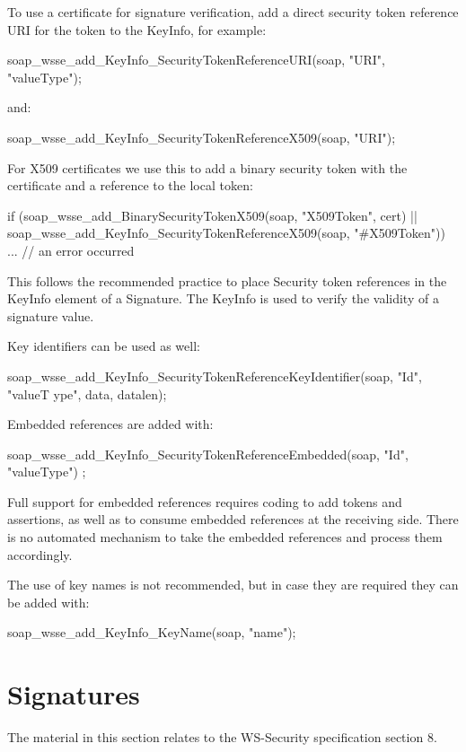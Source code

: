 To use a certificate for signature verification, add a direct security token reference URI for the token to the KeyInfo, for example:


\begin{DoxyCode}
    soap_wsse_add_KeyInfo_SecurityTokenReferenceURI(soap, "URI", "valueType");
\end{DoxyCode}


and:


\begin{DoxyCode}
    soap_wsse_add_KeyInfo_SecurityTokenReferenceX509(soap, "URI");
\end{DoxyCode}


For X509 certificates we use this to add a binary security token with the certificate and a reference to the local token:


\begin{DoxyCode}
    if (soap_wsse_add_BinarySecurityTokenX509(soap, "X509Token", cert)
     || soap_wsse_add_KeyInfo_SecurityTokenReferenceX509(soap, "#X509Token"))
      ... // an error occurred
\end{DoxyCode}


This follows the recommended practice to place Security token references in the KeyInfo element of a Signature. The KeyInfo is used to verify the validity of a signature value.

Key identifiers can be used as well:


\begin{DoxyCode}
    soap_wsse_add_KeyInfo_SecurityTokenReferenceKeyIdentifier(soap, "Id", "valueT
      ype", data, datalen);
\end{DoxyCode}


Embedded references are added with:


\begin{DoxyCode}
    soap_wsse_add_KeyInfo_SecurityTokenReferenceEmbedded(soap, "Id", "valueType")
      ;
\end{DoxyCode}


Full support for embedded references requires coding to add tokens and assertions, as well as to consume embedded references at the receiving side. There is no automated mechanism to take the embedded references and process them accordingly.

The use of key names is not recommended, but in case they are required they can be added with:


\begin{DoxyCode}
    soap_wsse_add_KeyInfo_KeyName(soap, "name");
\end{DoxyCode}
\hypertarget{wsse_wsse_8}{}\section{Signatures}\label{wsse_wsse_8}
The material in this section relates to the WS-\/Security specification section 8.

